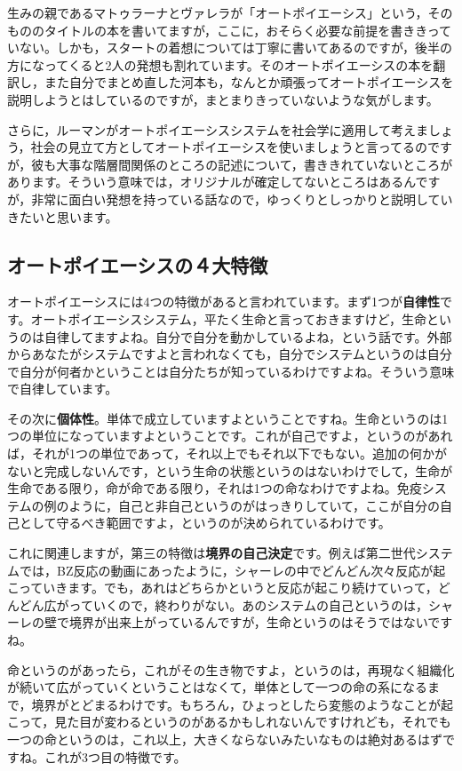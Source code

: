 \documentclass{ltjsbook}
\begin{document}
生みの親であるマトゥラーナとヴァレラが「オートポイエーシス」という，そのもののタイトルの本\parencite{Maturana_Varela}を書いてますが，ここに，おそらく必要な前提を書ききっていない。しかも，スタートの着想については丁寧に書いてあるのですが，後半の方になってくると2人の発想も割れています。そのオートポイエーシスの本を翻訳し，また自分でまとめ直した河本も，なんとか頑張ってオートポイエーシスを説明しようとはしている\parencite{KawamotoHideo}のですが，まとまりきっていないような気がします。

さらに，ルーマンがオートポイエーシスシステムを社会学に適用して考えましょう，社会の見立て方としてオートポイエーシスを使いましょうと言ってるのですが，彼も大事な階層間関係のところの記述について，書ききれていないところがあります。そういう意味では，オリジナルが確定してないところはあるんですが，非常に面白い発想を持っている話なので，ゆっくりとしっかりと説明していきたいと思います。

\subsection{オートポイエーシスの４大特徴}

オートポイエーシスには4つの特徴があると言われています。まず1つが\textbf{自律性}です。オートポイエーシスシステム，平たく生命と言っておきますけど，生命というのは自律してますよね。自分で自分を動かしているよね，という話です。外部からあなたがシステムですよと言われなくても，自分でシステムというのは自分で自分が何者かということは自分たちが知っているわけですよね。そういう意味で自律しています。

その次に\textbf{個体性}。単体で成立していますよということですね。生命というのは1つの単位になっていますよということです。これが自己ですよ，というのがあれば，それが1つの単位であって，それ以上でもそれ以下でもない。追加の何かがないと完成しないんです，という生命の状態というのはないわけでして，生命が生命である限り，命が命である限り，それは1つの命なわけですよね。免疫システムの例のように，自己と非自己というのがはっきりしていて，ここが自分の自己として守るべき範囲ですよ，というのが決められているわけです。


これに関連しますが，第三の特徴は\textbf{境界の自己決定}です。例えば第二世代システムでは，BZ反応の動画にあったように，シャーレの中でどんどん次々反応が起こっていきます。でも，あれはどちらかというと反応が起こり続けていって，どんどん広がっていくので，終わりがない。あのシステムの自己というのは，シャーレの壁で境界が出来上がっているんですが，生命というのはそうではないですね。

命というのがあったら，これがその生き物ですよ，というのは，再現なく組織化が続いて広がっていくということはなくて，単体として一つの命の系になるまで，境界がとどまるわけです。もちろん，ひょっとしたら変態のようなことが起こって，見た目が変わるというのがあるかもしれないんですけれども，それでも一つの命というのは，これ以上，大きくならないみたいなものは絶対あるはずですね。これが3つ目の特徴です。
\end{document}
